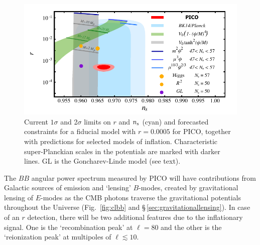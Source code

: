 \documentclass[PICOAPC.tex]{subfiles}
\begin{document}
\begin{figure}[!thb]
\parbox{4.5in}{\centerline{
\includegraphics[width=4.5in]{images/nsrlabeledrp0005_PICOv2.pdf} } }
\parbox{1.8in}{
\caption{\captiontext  Current $1\sigma$ and 2$\sigma$ limits on $r$ and $n_{\rm s}$ (cyan) and forecasted constraints for a fiducial model with $r = 0.0005$ for PICO, together with predictions for selected models of inflation. Characteristic super-Planckian scales in the potentials are marked with darker lines. GL is the Goncharev-Linde model (see text). }
\label{fig:nsr}}
\vspace{-0.1in}
\end{figure}

The $BB$ angular power spectrum measured by PICO will have contributions from Galactic sources of emission and `lensing' $B$-modes, created by gravitational lensing of $E$-modes as the CMB photons traverse the gravitational potentials throughout the Universe (Fig.~\ref{fig:clbb} and \S\,\ref{sec:gravitationallensing}).  In case of an $r$ detection, there will be two additional features due to the inflationary signal. One is the `recombination peak' at $\ell = 80$ and the other is the `reionization peak' at multipoles of $\ell\lesssim 10$. 
\end{document}
